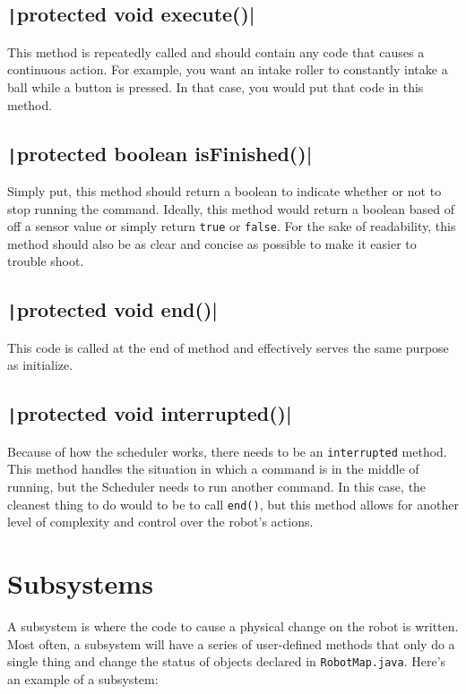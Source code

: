 \documentclass[11pt,fleqn]{article}
\newcommand{\mil}[2][java]{\texttt|#2|}
\begin{document}
\subsection{\mil{protected void execute()}}
This method is repeatedly called and should contain any code that causes a continuous action. For
example, you want an intake roller to constantly intake a ball while a button is pressed. In that
case, you would put that code in this method. 

\subsection{\mil{protected boolean isFinished()}}
Simply put, this method should return a boolean to indicate whether or not to stop running the
command. Ideally, this method would return a boolean based of off a sensor value or simply return
\texttt{true} or \texttt{false}. For the sake of readability, this method should also be as clear
and concise as possible to make it easier to trouble shoot. 

\subsection{\mil{protected void end()}}
This code is called at the end of method and effectively serves the same purpose as initialize.

\subsection{\mil{protected void interrupted()}}
Because of how the scheduler works, there needs to be an \texttt{interrupted} method. This method
handles the situation in which a command is in the middle of running, but the Scheduler needs to run
another command. In this case, the cleanest thing to do would to be to call \texttt{end()}, but this
method allows for another level of complexity and control over the robot's actions.

\section{Subsystems}
A subsystem is where the code to cause a physical change on the robot is written. Most often, a
subsystem will have a series of user-defined methods that only do a single thing and change the
status of objects declared in \texttt{RobotMap.java}. Here's an example of a subsystem: 
\end{document}
